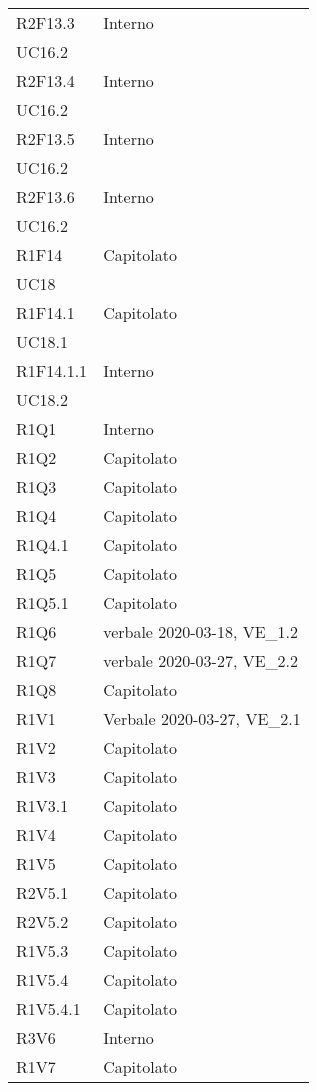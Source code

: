 \begin{longtable}{ 
		>{\centering}p{}
		>{\centering}p{}}
	R2F13.3	& Interno\\	UC16.2 \tabularnewline
	R2F13.4	& Interno\\	UC16.2 \tabularnewline
	R2F13.5	& Interno\\	UC16.2 \tabularnewline
	R2F13.6	& Interno\\	UC16.2 \tabularnewline
	R1F14	& Capitolato\\	UC18 \tabularnewline
	R1F14.1	& Capitolato\\	UC18.1 \tabularnewline
	R1F14.1.1 &	Interno\\	UC18.2 \tabularnewline
	R1Q1& 	Interno	 \tabularnewline
	R1Q2 &	Capitolato	 \tabularnewline
	R1Q3 &	Capitolato	 \tabularnewline
	R1Q4 &	Capitolato	 \tabularnewline
	R1Q4.1 &	Capitolato	\tabularnewline
	R1Q5 &	Capitolato	\tabularnewline
	R1Q5.1	& Capitolato\tabularnewline
	R1Q6 &	verbale 2020-03-18, VE\_1.2 \tabularnewline 	
	R1Q7& 	verbale 2020-03-27, VE\_2.2	 \tabularnewline
	R1Q8 &	Capitolato	 \tabularnewline
	R1V1 &	Verbale 2020-03-27, VE\_2.1	 \tabularnewline
	R1V2 &	Capitolato	 \tabularnewline
	R1V3 &	Capitolato	 \tabularnewline
	R1V3.1 &	Capitolato	 \tabularnewline
	R1V4 &	Capitolato	\tabularnewline
	R1V5 &	Capitolato	\tabularnewline
	R2V5.1 &	Capitolato	\tabularnewline
	R2V5.2 &	Capitolato	\tabularnewline
	R1V5.3 &	Capitolato	\tabularnewline
	R1V5.4 &	Capitolato	\tabularnewline
	R1V5.4.1 &	Capitolato	\tabularnewline
	R3V6 &	Interno	\tabularnewline
	R1V7 & Capitolato
	
	
\end{longtable}	

